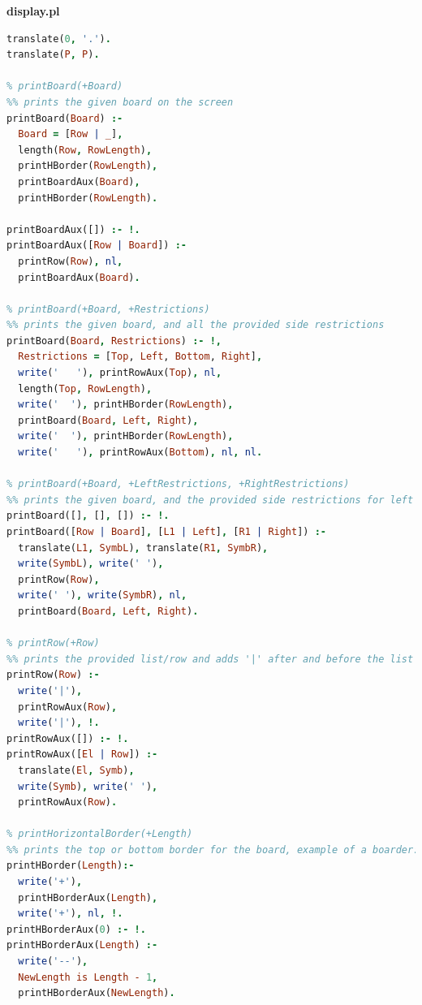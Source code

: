 \documentclass{llncs}
\begin{document}
\huge\textbf{display.pl}
\begin{lstlisting}[language=Prolog]
%Dictionary for user friendly visualization of elements
translate(0, '.').
translate(P, P).

% printBoard(+Board)
%% prints the given board on the screen
printBoard(Board) :-
  Board = [Row | _],
  length(Row, RowLength),
  printHBorder(RowLength),
  printBoardAux(Board),
  printHBorder(RowLength).

printBoardAux([]) :- !.
printBoardAux([Row | Board]) :-  
  printRow(Row), nl,
  printBoardAux(Board).

% printBoard(+Board, +Restrictions)
%% prints the given board, and all the provided side restrictions
printBoard(Board, Restrictions) :- !,
  Restrictions = [Top, Left, Bottom, Right],
  write('   '), printRowAux(Top), nl,
  length(Top, RowLength), 
  write('  '), printHBorder(RowLength),
  printBoard(Board, Left, Right),
  write('  '), printHBorder(RowLength),
  write('   '), printRowAux(Bottom), nl, nl.

% printBoard(+Board, +LeftRestrictions, +RightRestrictions)
%% prints the given board, and the provided side restrictions for left and right
printBoard([], [], []) :- !.
printBoard([Row | Board], [L1 | Left], [R1 | Right]) :-
  translate(L1, SymbL), translate(R1, SymbR),
  write(SymbL), write(' '),
  printRow(Row),
  write(' '), write(SymbR), nl,
  printBoard(Board, Left, Right).

% printRow(+Row)
%% prints the provided list/row and adds '|' after and before the list
printRow(Row) :-
  write('|'),
  printRowAux(Row),
  write('|'), !.
printRowAux([]) :- !.
printRowAux([El | Row]) :-
  translate(El, Symb),
  write(Symb), write(' '),
  printRowAux(Row).

% printHorizontalBorder(+Length)
%% prints the top or bottom border for the board, example of a boarder: '+-------+'
printHBorder(Length):-
  write('+'),
  printHBorderAux(Length),
  write('+'), nl, !.
printHBorderAux(0) :- !.
printHBorderAux(Length) :-
  write('--'),
  NewLength is Length - 1,
  printHBorderAux(NewLength).
\end{lstlisting}
\newpage
\end{document}
